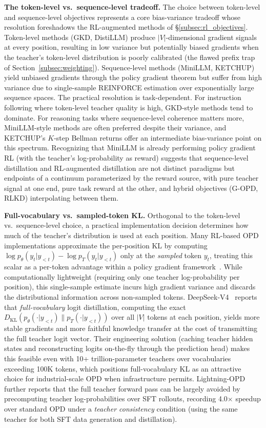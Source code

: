 \documentclass{article} %
\newcommand{\KL}{D_{\mathrm{KL}}}
\newcommand{\ptheta}{p_\theta}
\newcommand{\pteacher}{p_T}
\begin{document}
\textbf{The token-level vs.\ sequence-level tradeoff.} The choice between token-level and sequence-level objectives represents a core bias-variance tradeoff whose resolution foreshadows the RL-augmented methods of \S\ref{subsec:rl_objectives}. Token-level methods (GKD, DistiLLM) produce $|V|$-dimensional gradient signals at every position, resulting in low variance but potentially biased gradients when the teacher's token-level distribution is poorly calibrated (the flawed prefix trap of Section~\ref{subsec:weighting}). Sequence-level methods (MiniLLM, KETCHUP) yield unbiased gradients through the policy gradient theorem but suffer from high variance due to single-sample REINFORCE estimation over exponentially large sequence spaces. The practical resolution is task-dependent. For instruction following where token-level teacher quality is high, GKD-style methods tend to dominate. For reasoning tasks where sequence-level coherence matters more, MiniLLM-style methods are often preferred despite their variance, and KETCHUP's $K$-step Bellman returns offer an intermediate bias-variance point on this spectrum. Recognizing that MiniLLM is already performing policy gradient RL (with the teacher's log-probability as reward) suggests that sequence-level distillation and RL-augmented distillation are not distinct paradigms but endpoints of a continuum parameterized by the reward source, with pure teacher signal at one end, pure task reward at the other, and hybrid objectives (G-OPD, RLKD) interpolating between them.

\textbf{Full-vocabulary vs.\ sampled-token KL.} Orthogonal to the token-level vs.\ sequence-level choice, a practical implementation decision determines how much of the teacher's distribution is used at each position. Many RL-based OPD implementations approximate the per-position KL by computing $\log \ptheta(y_t|y_{<t}) - \log \pteacher(y_t|y_{<t})$ only at the \emph{sampled} token $y_t$, treating this scalar as a per-token advantage within a policy gradient framework~\citep{lu2025onpolicy}. While computationally lightweight (requiring only one teacher log-probability per position), this single-sample estimate incurs high gradient variance and discards the distributional information across non-sampled tokens. DeepSeek-V4~\citep{deepseekv4} reports that \emph{full-vocabulary} logit distillation, computing the exact $\KL(\ptheta(\cdot|y_{<t}) \parallel \pteacher(\cdot|y_{<t}))$ over all $|V|$ tokens at each position, yields more stable gradients and more faithful knowledge transfer at the cost of transmitting the full teacher logit vector. Their engineering solution (caching teacher hidden states and reconstructing logits on-the-fly through the prediction head) makes this feasible even with 10+ trillion-parameter teachers over vocabularies exceeding 100K tokens, which positions full-vocabulary KL as an attractive choice for industrial-scale OPD when infrastructure permits. Lightning-OPD~\citep{2604.13010} further reports that the full teacher forward pass can be largely avoided by precomputing teacher log-probabilities over SFT rollouts, recording 4.0$\times$ speedup over standard OPD under a \emph{teacher consistency} condition (using the same teacher for both SFT data generation and distillation).
\end{document}
